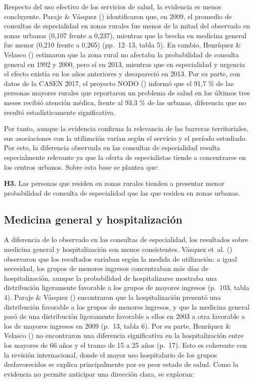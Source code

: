 \documentclass[
  spanish,
  a4paper,
  oneside]{scrbook}
\begin{document}
Respecto del uso efectivo de los servicios de salud, la evidencia es
menos concluyente. Paraje \& Vásquez
() identificaron que, en 2009, el
promedio de consultas de especialidad en zonas rurales fue menos de la
mitad del observado en zonas urbanas (0,107 frente a 0,237), mientras
que la brecha en medicina general fue menor (0,210 frente a 0,265)
(pp.~12--13, tabla 5). En cambio, Henríquez \& Velasco
() estimaron que la
zona rural no afectaba la probabilidad de consulta general en 1992 y
2000, pero sí en 2013, mientras que en especialidad y urgencia el efecto
existía en los años anteriores y desapareció en 2013. Por su parte, con
datos de la CASEN 2017, el proyecto NODO
() informó que el 91,7 \% de
las personas mayores rurales que reportaron un problema de salud en los
últimos tres meses recibió atención médica, frente al 93,3 \% de las
urbanas, diferencia que no resultó estadísticamente significativa.

Por tanto, aunque la evidencia confirma la relevancia de las barreras
territoriales, sus asociaciones con la utilización varían según el
servicio y el período estudiado. Por esto, la diferencia observada en
las consultas de especialidad resulta especialmente relevante ya que la
oferta de especialistas tiende a concentrarse en los centros urbanos.
Sobre esta base se plantea que:

\textbf{H3.} Las personas que residen en zonas rurales tienden a
presentar menor probabilidad de consulta de especialidad que las que
residen en zonas urbanas.

\subsection{Medicina general y
hospitalización}\label{medicina-general-y-hospitalizaciuxf3n}

A diferencia de lo observado en las consultas de especialidad, los
resultados sobre medicina general y hospitalización son menos
consistentes. Vásquez et~al.
() observaron que los
resultados variaban según la medida de utilización: a igual necesidad,
los grupos de menores ingresos concentraban más días de hospitalización,
aunque la probabilidad de hospitalizarse mostraba una distribución
ligeramente favorable a los grupos de mayores ingresos (p.~103, tabla
4). Paraje \& Vásquez ()
encontraron que la hospitalización presentó una distribución favorable a
los grupos de menores ingresos, y que la medicina general pasó de una
distribución ligeramente favorable a ellos en 2003 a otra favorable a
los de mayores ingresos en 2009 (p.~13, tabla 6). Por su parte,
Henríquez \& Velasco ()
no encontraron una diferencia significativa en la hospitalización entre
los mayores de 66 años y el tramo de 15 a 25 años (p.~17). Esto es
coherente con la revisión internacional, donde el mayor uso hospitalario
de los grupos desfavorecidos se explica principalmente por su peor
estado de salud. Como la evidencia no permite anticipar una dirección
clara, se exploran:
\end{document}
